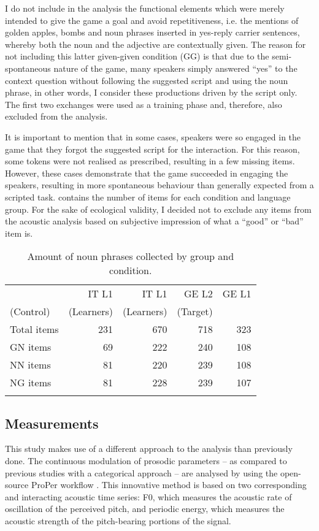 I do not include in the analysis the functional elements which were merely intended to give the game a goal and avoid repetitiveness, i.e. the mentions of golden apples, bombs and noun phrases inserted in yes-reply carrier sentences, whereby both the noun and the adjective are contextually given. The reason for not including this latter given-given condition (GG) is that due to the semi-spontaneous nature of the game, many speakers simply answered “yes” to the context question without following the suggested script and using the noun phrase, in other words, I consider these productions driven by the script only. The first two exchanges were used as a training phase and, therefore, also excluded from the analysis.

It is important to mention that in some cases, speakers were so engaged in the game that they forgot the suggested script for the interaction. For this reason, some tokens were not realised as prescribed, resulting in a few missing items. However, these cases demonstrate that the game succeeded in engaging the speakers, resulting in more spontaneous behaviour than generally expected from a scripted task.  contains the number of items for each condition and language group. For the sake of ecological validity, I decided not to exclude any items from the acoustic analysis based on subjective impression of what a “good” or “bad” item is.


\begin{table}
\begin{tabular}{lrrrr}
\lsptoprule
 & IT L1 & IT L1 & GE L2 & GE L1 \\
(Control) & (Learners) & (Learners) & (Target)\\
\midrule
Total items & 231 & 670 & 718 & 323\\
GN items & 69 & 222 & 240 & 108\\
NN items & 81 & 220 & 239 & 108\\
NG items & 81 & 228 & 239 & 107\\
\lspbottomrule
\end{tabular}
\caption{Amount of noun phrases collected by group and condition.}
\label{tab:2.2}
\end{table}


\subsection{Measurements}
\label{sec:2.2.3}
This study makes use of a different approach to the analysis than previously done. The continuous modulation of prosodic parameters – as compared to previous studies with a categorical approach – are analysed by using the open-source ProPer workflow \citep{AlbertEtAl2020}. This innovative method is based on two corresponding and interacting acoustic time series: F0, which measures the acoustic rate of oscillation of the perceived pitch, and periodic energy, which measures the acoustic strength of the pitch-bearing portions of the signal. 

